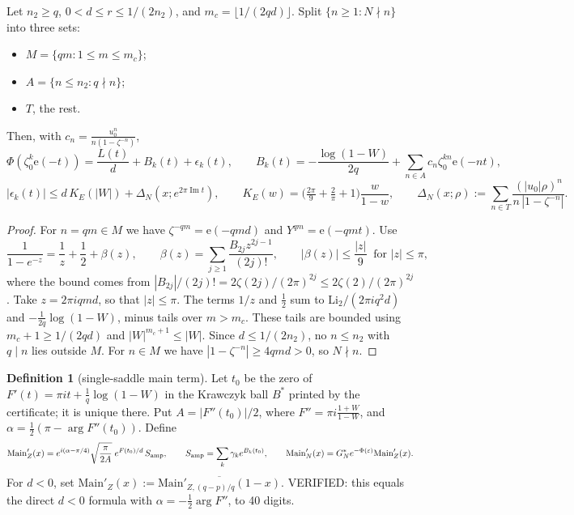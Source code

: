 \documentclass[11pt]{article}
\theoremstyle{definition}\newtheorem{definition}[theorem]{Definition}
\theoremstyle{remark}\newtheorem{remark}[theorem]{Remark}
\newcommand{\e}{\mathrm{e}}
\begin{document}
\begin{lemma}\label{lem:dec}
Let $n_2\ge q$, $0<d\le r\le 1/(2n_2)$, and $m_c=\lfloor1/(2qd)\rfloor$. Split $\{n\ge1:N\nmid n\}$ into three sets:
\begin{itemize}
\item $M=\{qm:1\le m\le m_c\}$;
\item $A=\{n\le n_2:q\nmid n\}$;
\item $T$, the rest.
\end{itemize}
Then, with $c_n=\frac{u_0^n}{n(1-\zeta^{-n})}$,
\[\Phi(\zeta_0^k\e(-t))=\frac{L(t)}d+B_k(t)+\epsilon_k(t),\qquad B_k(t)=-\frac{\log(1-W)}{2q}+\sum_{n\in A}c_n\zeta_0^{kn}\e(-nt),\]
\[|\epsilon_k(t)|\le d\,K_E(|W|)+\Delta_N(x;e^{2\pi\operatorname{Im}t}),\qquad K_E(w)=\big(\tfrac{2\pi}9+\tfrac2\pi+1\big)\frac{w}{1-w},\qquad
\Delta_N(x;\rho):=\sum_{n\in T}\frac{(|u_0|\rho)^n}{n\,|1-\zeta^{-n}|}.\]
\end{lemma}
\begin{proof}
For $n=qm\in M$ we have $\zeta^{-qm}=\e(-qmd)$ and $Y^{qm}=\e(-qmt)$. Use
\[\frac1{1-e^{-z}}=\frac1z+\frac12+\beta(z),\qquad \beta(z)=\sum_{j\ge1}\frac{B_{2j}z^{2j-1}}{(2j)!},\qquad |\beta(z)|\le\frac{|z|}{9}\ \text{ for }|z|\le\pi,\]
where the bound comes from $|B_{2j}|/(2j)!=2\zeta(2j)/(2\pi)^{2j}\le 2\zeta(2)/(2\pi)^{2j}$. Take $z=2\pi iqmd$, so that $|z|\le\pi$.
The terms $1/z$ and $\frac12$ sum to $\mathrm{Li}_2/(2\pi iq^2d)$ and $-\frac1{2q}\log(1-W)$, minus tails over $m>m_c$. These tails are bounded using $m_c+1\ge1/(2qd)$ and $|W|^{m_c+1}\le|W|$.
Since $d\le1/(2n_2)$, no $n\le n_2$ with $q\mid n$ lies outside $M$. For $n\in M$ we have $|1-\zeta^{-n}|\ge4qmd>0$, so $N\nmid n$.
\end{proof}

\begin{definition}[single-saddle main term]\label{def:main}
Let $t_0$ be the zero of $F'(t)=\pi it+\frac1q\log(1-W)$ in the Krawczyk ball $B^*$ printed by the certificate; it is unique there.
Put $A=|F''(t_0)|/2$, where $F''=\pi i\frac{1+W}{1-W}$, and $\alpha=\frac12(\pi-\arg F''(t_0))$. Define
\[\mathrm{Main}'_Z(x)=e^{i(\alpha-\pi/4)}\sqrt{\frac{\pi}{2A}}\;e^{F(t_0)/d}\,S_{\rm amp},\qquad S_{\rm amp}=\sum_k\gamma_k e^{B_k(t_0)},\qquad
\mathrm{Main}'_N(x)=G^*_Ne^{-\Phi(\varepsilon)}\mathrm{Main}'_Z(x).\]
For $d<0$, set $\mathrm{Main}'_Z(x):=\overline{\mathrm{Main}'_{Z,(q-p)/q}(1-x)}$. VERIFIED: this equals the direct $d<0$ formula with $\alpha=-\frac12\arg F''$, to 40 digits.
\end{definition}
\end{document}
